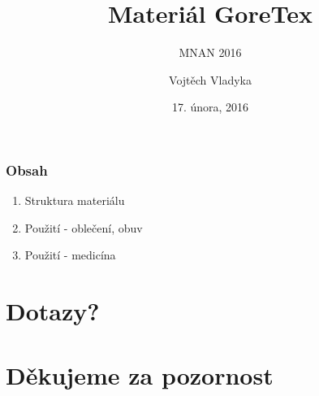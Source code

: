 \documentclass{beamer}
\title{Materiál GoreTex}
\subtitle{MNAN 2016}
\author{Vojtěch Vladyka}
\date{17. února, 2016}
\begin{document}
    \frame{\titlepage}
	   \begin{frame}
           \frametitle{Obsah}
           \begin{enumerate}
               \item Struktura materiálu
               \item Použití - oblečení, obuv
               \item Použití - medicína
           \end{enumerate}
       \end{frame}
       \section{Dotazy?}
       \section{Děkujeme za pozornost}
\end{document}
